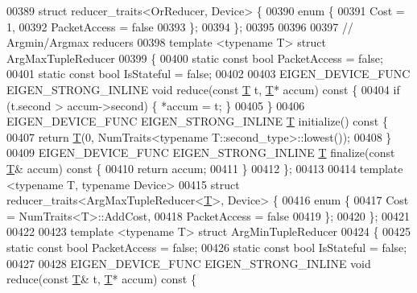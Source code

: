 \begin{DoxyCode}
00389 \textcolor{keyword}{struct }reducer\_traits<OrReducer, Device> \{
00390   \textcolor{keyword}{enum} \{
00391     Cost = 1,
00392     PacketAccess = \textcolor{keyword}{false}
00393   \};
00394 \};
00395 
00396 
00397 \textcolor{comment}{// Argmin/Argmax reducers}
00398 \textcolor{keyword}{template} <\textcolor{keyword}{typename} T> \textcolor{keyword}{struct }ArgMaxTupleReducer
00399 \{
00400   \textcolor{keyword}{static} \textcolor{keyword}{const} \textcolor{keywordtype}{bool} PacketAccess = \textcolor{keyword}{false};
00401   \textcolor{keyword}{static} \textcolor{keyword}{const} \textcolor{keywordtype}{bool} IsStateful = \textcolor{keyword}{false};
00402 
00403   EIGEN\_DEVICE\_FUNC EIGEN\_STRONG\_INLINE \textcolor{keywordtype}{void} reduce(\textcolor{keyword}{const} \hyperlink{group___sparse_core___module_class_eigen_1_1_triplet}{T} t, \hyperlink{group___sparse_core___module_class_eigen_1_1_triplet}{T}* accum)\textcolor{keyword}{ const }\{
00404     \textcolor{keywordflow}{if} (t.second > accum->second) \{ *accum = t; \}
00405   \}
00406   EIGEN\_DEVICE\_FUNC EIGEN\_STRONG\_INLINE \hyperlink{group___sparse_core___module_class_eigen_1_1_triplet}{T} initialize()\textcolor{keyword}{ const }\{
00407     \textcolor{keywordflow}{return} \hyperlink{group___sparse_core___module_class_eigen_1_1_triplet}{T}(0, NumTraits<typename T::second\_type>::lowest());
00408   \}
00409   EIGEN\_DEVICE\_FUNC EIGEN\_STRONG\_INLINE \hyperlink{group___sparse_core___module_class_eigen_1_1_triplet}{T} finalize(\textcolor{keyword}{const} \hyperlink{group___sparse_core___module_class_eigen_1_1_triplet}{T}& accum)\textcolor{keyword}{ const }\{
00410     \textcolor{keywordflow}{return} accum;
00411   \}
00412 \};
00413 
00414 \textcolor{keyword}{template} <\textcolor{keyword}{typename} T, \textcolor{keyword}{typename} Device>
00415 \textcolor{keyword}{struct }reducer\_traits<ArgMaxTupleReducer<\hyperlink{group___sparse_core___module_class_eigen_1_1_triplet}{T}>, Device> \{
00416   \textcolor{keyword}{enum} \{
00417     Cost = NumTraits<T>::AddCost,
00418     PacketAccess = \textcolor{keyword}{false}
00419   \};
00420 \};
00421 
00422 
00423 \textcolor{keyword}{template} <\textcolor{keyword}{typename} T> \textcolor{keyword}{struct }ArgMinTupleReducer
00424 \{
00425   \textcolor{keyword}{static} \textcolor{keyword}{const} \textcolor{keywordtype}{bool} PacketAccess = \textcolor{keyword}{false};
00426   \textcolor{keyword}{static} \textcolor{keyword}{const} \textcolor{keywordtype}{bool} IsStateful = \textcolor{keyword}{false};
00427 
00428   EIGEN\_DEVICE\_FUNC EIGEN\_STRONG\_INLINE \textcolor{keywordtype}{void} reduce(\textcolor{keyword}{const} \hyperlink{group___sparse_core___module_class_eigen_1_1_triplet}{T}& t, \hyperlink{group___sparse_core___module_class_eigen_1_1_triplet}{T}* accum)\textcolor{keyword}{ const }\{

\end{DoxyCode}
